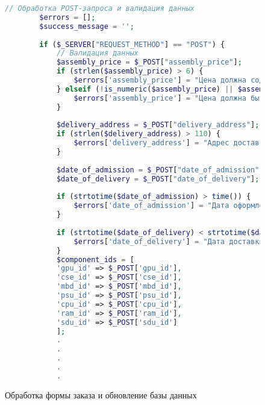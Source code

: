 \begin{figure}[ht]
	\begin{lstlisting}[language=Php]
		// Обработка POST-запроса и валидация данных
		$errors = [];
		$success_message = '';
		
		if ($_SERVER["REQUEST_METHOD"] == "POST") {
			// Валидация данных
			$assembly_price = $_POST["assembly_price"];
			if (strlen($assembly_price) > 6) {
				$errors['assembly_price'] = "Цена должна содержать не более 6 символов.";
			} elseif (!is_numeric($assembly_price) || $assembly_price < 0) {
				$errors['assembly_price'] = "Цена должна быть неотрицательным числом.";
			}
			
			$delivery_address = $_POST["delivery_address"];
			if (strlen($delivery_address) > 110) {
				$errors['delivery_address'] = "Адрес доставки не должен превышать 110 символов.";
			}
			
			$date_of_admission = $_POST["date_of_admission"];
			$date_of_delivery = $_POST["date_of_delivery"];
			
			if (strtotime($date_of_admission) > time()) {
				$errors['date_of_admission'] = "Дата оформления не может быть в будущем.";
			}
			
			if (strtotime($date_of_delivery) < strtotime($date_of_admission)) {
				$errors['date_of_delivery'] = "Дата доставки должна быть позже даты оформления.";
			}			
			$component_ids = [
			'gpu_id' => $_POST['gpu_id'],
			'cse_id' => $_POST['cse_id'],
			'mbd_id' => $_POST['mbd_id'],
			'psu_id' => $_POST['psu_id'],
			'cpu_id' => $_POST['cpu_id'],
			'ram_id' => $_POST['ram_id'],
			'sdu_id' => $_POST['sdu_id']
			];		
			.
			.
			.
			.
			.		   
	\end{lstlisting}
\caption{Обработка формы заказа и обновление базы данных}
\label{fig:orderform_part2}
\end{figure}


